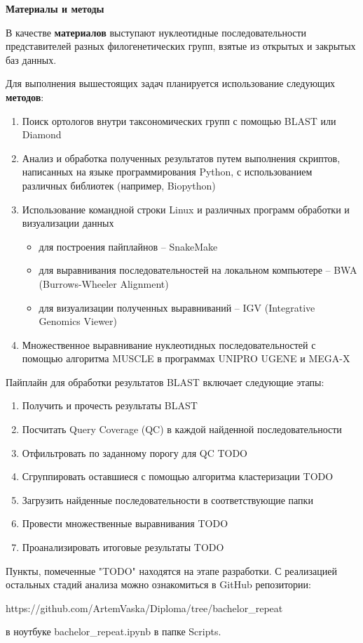 \newpage
\begin{center}
  \textbf{\large Материалы и методы}
\end{center}


В качестве \textbf{материалов} выступают нуклеотидные последовательности представителей разных филогенетических групп, взятые из открытых и закрытых баз данных.

Для выполнения вышестоящих задач планируется использование следующих \textbf{методов}:

\begin{enumerate}
    \item Поиск ортологов внутри таксономических групп с помощью BLAST или Diamond
    \item Анализ и обработка полученных результатов путем выполнения скриптов, написанных на языке программирования Python, с использованием различных библиотек (например, Biopython)
    \item Использование командной строки Linux и различных программ обработки и визуализации данных
    \begin{itemize}
        \item для построения пайплайнов – SnakeMake
        \item для выравнивания последовательностей на локальном компьютере – BWA (Burrows-Wheeler Alignment)
        \item для визуализации полученных выравниваний – IGV (Integrative Genomics Viewer)
    \end{itemize}
    \item Множественное выравнивание нуклеотидных последовательностей с помощью алгоритма MUSCLE в программах UNIPRO UGENE и MEGA-X
\end{enumerate}

Пайплайн для обработки результатов BLAST включает следующие этапы:

\begin{enumerate}
    \item Получить и прочесть результаты BLAST
    \item Посчитать Query Coverage (QC) в каждой найденной последовательности
    \item Отфильтровать по заданному порогу для QC TODO
    \item Сгруппировать оставшиеся с помощью алгоритма кластеризации TODO
    \item Загрузить найденные последовательности в соответствующие папки
    \item Провести множественные выравнивания TODO
    \item Проанализировать итоговые результаты TODO
\end{enumerate}

Пункты, помеченные "TODO" находятся на этапе разработки. С реализацией остальных стадий анализа можно ознакомиться в GitHub репозитории:

https://github.com/ArtemVaska/Diploma/tree/bachelor\_repeat

в ноутбуке bachelor\_repeat.ipynb в папке Scripts.
